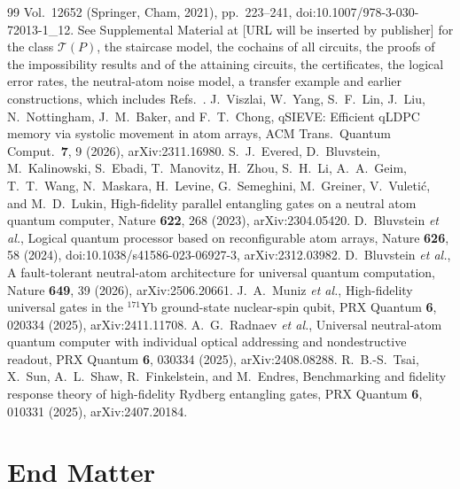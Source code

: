 \documentclass[aps,prl,twocolumn,superscriptaddress,nofootinbib]{revtex4-2}
\newcommand{\T}{\mathcal{T}}
\begin{document}
\begin{thebibliography}{99}
Vol.~12652 (Springer, Cham, 2021), pp.~223--241, doi:10.1007/978-3-030-72013-1\_12.
 See Supplemental Material at [URL will be inserted by publisher] for the
class $\T(P)$, the staircase model, the cochains of all circuits, the proofs of the
impossibility results and of the attaining circuits, the certificates, the logical error
rates, the neutral-atom noise model, a transfer example and earlier constructions, which
includes Refs.~\cite{Bravyi2024,Strikis2026,Xu2023,Gidney2021honeycomb,Gidney2021stim,CaDiCaL2024,DRATtrim2014,Bogaerts2023,GochtNordstrom2021,Tan2021cakelpr,Viszlai2026,Evered2023,Bluvstein2024,Bluvstein2025,Muniz2024,Radnaev2025,Tsai2025}.
 J.~Viszlai, W.~Yang, S.~F.~Lin, J.~Liu, N.~Nottingham,
J.~M.~Baker, and F.~T.~Chong, qSIEVE: Efficient qLDPC memory via systolic movement in
atom arrays, ACM Trans.\ Quantum Comput.\ \textbf{7}, 9 (2026), arXiv:2311.16980.
 S.~J.~Evered, D.~Bluvstein, M.~Kalinowski, S.~Ebadi, T.~Manovitz,
H.~Zhou, S.~H.~Li, A.~A.~Geim, T.~T.~Wang, N.~Maskara, H.~Levine, G.~Semeghini,
M.~Greiner, V.~Vuleti\'c, and M.~D.~Lukin, High-fidelity parallel entangling gates on a
neutral atom quantum computer, Nature \textbf{622}, 268 (2023), arXiv:2304.05420.
 D.~Bluvstein \emph{et al.}, Logical quantum processor based on
reconfigurable atom arrays, Nature \textbf{626}, 58 (2024),
doi:10.1038/s41586-023-06927-3, arXiv:2312.03982.
 D.~Bluvstein \emph{et al.}, A fault-tolerant neutral-atom
architecture for universal quantum computation, Nature \textbf{649}, 39 (2026),
arXiv:2506.20661.
 J.~A.~Muniz \emph{et al.}, High-fidelity universal gates in the
$^{171}$Yb ground-state nuclear-spin qubit, PRX Quantum \textbf{6}, 020334 (2025),
arXiv:2411.11708.
 A.~G.~Radnaev \emph{et al.}, Universal neutral-atom quantum
computer with individual optical addressing and nondestructive readout, PRX Quantum
\textbf{6}, 030334 (2025), arXiv:2408.08288.
 R.~B.-S.~Tsai, X.~Sun, A.~L.~Shaw, R.~Finkelstein, and M.~Endres,
Benchmarking and fidelity response theory of high-fidelity Rydberg entangling gates,
PRX Quantum \textbf{6}, 010331 (2025), arXiv:2407.20184.
\end{thebibliography}

\section*{End Matter}
\end{document}
